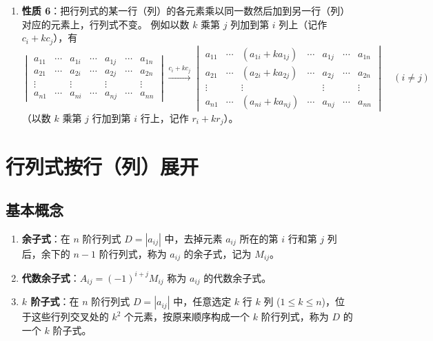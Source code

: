 \documentclass[UTF8]{ctexart}
\theoremstyle{mydef}
\begin{document}
\begin{enumerate}
$$\begin{vmatrix}
    a_{n1} & a_{n2} & \cdots & a'_{ni} & \cdots & a_{nn}
    \end{vmatrix}
    $$
    \item \textbf{性质 6}：把行列式的某一行（列）的各元素乘以同一数然后加到另一行（列）对应的元素上，行列式不变。
    例如以数 $k$ 乘第 $j$ 列加到第 $i$ 列上（记作 $c_i + k c_j$），有
    $$
    \begin{vmatrix}
    a_{11} & \cdots & a_{1i} & \cdots & a_{1j} & \cdots & a_{1n} \\
    a_{21} & \cdots & a_{2i} & \cdots & a_{2j} & \cdots & a_{2n} \\
    \vdots & & \vdots & & \vdots & & \vdots \\
    a_{n1} & \cdots & a_{ni} & \cdots & a_{nj} & \cdots & a_{nn}
    \end{vmatrix}
    \xrightarrow{c_i + k c_j}
    \begin{vmatrix}
    a_{11} & \cdots & (a_{1i} + k a_{1j}) & \cdots & a_{1j} & \cdots & a_{1n} \\
    a_{21} & \cdots & (a_{2i} + k a_{2j}) & \cdots & a_{2j} & \cdots & a_{2n} \\
    \vdots & & \vdots & & \vdots & & \vdots \\
    a_{n1} & \cdots & (a_{ni} + k a_{nj}) & \cdots & a_{nj} & \cdots & a_{nn}
    \end{vmatrix}
    \quad (i \neq j)
    $$
    （以数 $k$ 乘第 $j$ 行加到第 $i$ 行上，记作 $r_i + k r_j$）。
\end{enumerate}

\section{行列式按行（列）展开}

\subsection{基本概念}

\begin{enumerate}
    \item \textbf{余子式}：在 $n$ 阶行列式 $D = |a_{ij}|$ 中，去掉元素 $a_{ij}$ 所在的第 $i$ 行和第 $j$ 列后，余下的 $n-1$ 阶行列式，称为 $a_{ij}$ 的余子式，记为 $M_{ij}$。
    \item \textbf{代数余子式}：$A_{ij} = (-1)^{i+j}M_{ij}$ 称为 $a_{ij}$ 的代数余子式。
    \item \textbf{$k$ 阶子式}：在 $n$ 阶行列式 $D = |a_{ij}|$ 中，任意选定 $k$ 行 $k$ 列 ($1 \le k \le n$)，位于这些行列交叉处的 $k^2$ 个元素，按原来顺序构成一个 $k$ 阶行列式，称为 $D$ 的一个 $k$ 阶子式。
\end{enumerate}
\end{document}
